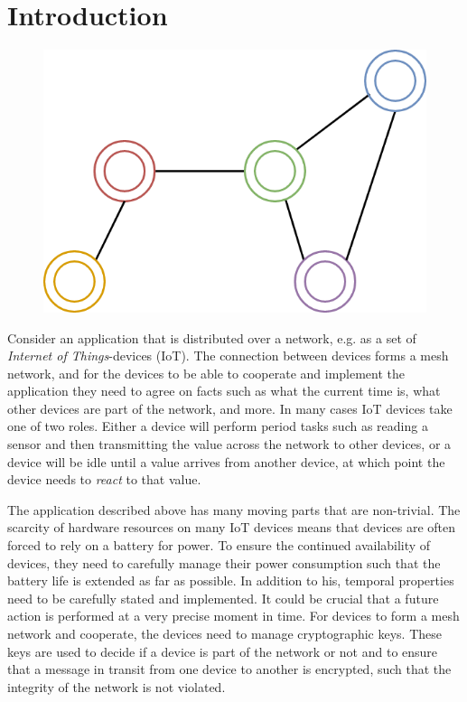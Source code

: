 \chapter{Introduction}
\label{chap:introduction}

\begin{figure}[h]
    \centering
    \includegraphics[scale=0.2]{graphics/mesh.png}
\end{figure}

Consider an application that is distributed over a network, e.g. as a set of \textit{Internet of Things}-devices (IoT). The
connection between devices forms a mesh network, and for the devices to be able to cooperate and implement the application they
need to agree on facts such as what the current time is, what other devices are part of the network, and more. In many cases
IoT devices take one of two roles. Either a device will perform period tasks such as reading a sensor and then transmitting
the value across the network to other devices, or a device will be idle until a value arrives from another device, at which point
the device needs to \textit{react} to that value.

The application described above has many moving parts that are non-trivial. The scarcity of hardware resources on many IoT
devices means that devices are often forced to rely on a battery for power. To ensure the continued availability of devices,
they need to carefully manage their power consumption such that the battery life is extended as far as possible. In addition to 
his, temporal properties need to be carefully stated and implemented. It could be crucial that a future action is
performed at a very precise moment in time. For devices to form a mesh network
and cooperate, the devices need to manage cryptographic keys. These keys are used to decide if a device is part of the network
or not and to ensure that a message in transit from one device to another is encrypted, such that the integrity of the network
is not violated.

